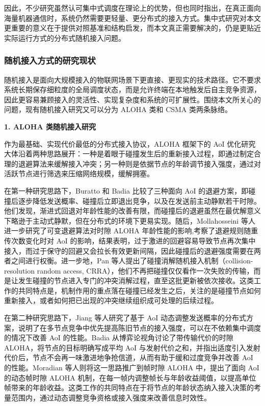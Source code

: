因此，不少研究虽然认可集中式调度在理论上的优势，但也同时指出，在真正面向海量机器通信时，系统仍然需要更轻量、更分布式的接入方式。集中式研究对本文更重要的意义在于提供对照基准和结构启发，而本文真正需要解决的，仍是更贴近实际运行方式的分布式随机接入问题。

\subsubsection{随机接入方式的研究现状}

随机接入是面向大规模接入的物联网场景下更直接、更现实的技术路径。它不要求系统长期保存细粒度的全局调度状态，而是允许终端在本地触发后自主竞争资源，因此更容易兼顾接入的灵活性、实现复杂度和系统的可扩展性\cite{chen2022age}。围绕本文所关心的问题，现有随机接入研究又可以分为 ALOHA 类和 CSMA 类两条脉络。

\textbf{1. ALOHA 类随机接入研究}

作为最基础、实现代价最低的分布式接入协议，ALOHA 框架下的 AoI 优化研究大体沿着两种思路展开：一种是着眼于碰撞发生后的重新接入过程，即通过制定合理的退避算法来缓解接入冲突；另一种则是依据节点的年龄调节接入强度，通过对活跃节点进行筛选来压缩网络规模，缓解拥塞。

在第一种研究思路下，Buratto 和 Badia 比较了三种面向 AoI 的退避方案，即碰撞后逐步降低发送概率、碰撞后立即退出竞争，以及在发送前主动静默若干时隙\cite{buratto2023analysis}。他们发现，渐进式回退对年龄性能的改善有限，而碰撞后的退避虽然在最优解意义下略逊于主动式静默，但在分布式的环境下更易实现。随后，Mollahosseini 等人进一步研究了可变退避算法对时隙 ALOHA 年龄性能的影响\cite{mollahosseini2024effect},考察了退避规则随重传次数变化时对 AoI 的影响，结果表明，过于激进的回避容易导致节点再次集中接入，而过于保守的回避又会拉长有效更新间隔，因此碰撞后的退避强度需要在两者之间进行权衡。进一步地，Pan 等人提出了碰撞消解随机接入机制（collision-resolution random access, CRRA）\cite{pan2022age}，他们不再把碰撞仅仅看作一次失败的传输，而是让发生碰撞的节点进入专门的冲突消解过程，直至这批更新被依次接收。这类工作的共同特点是，机制作用的重点落在碰撞已经发生之后，关注的是碰撞节点如何重新接入，或者如何把已出现的冲突继续组织成可处理的后续过程。

在第二种研究思路下，Jiang 等人研究了基于 AoI 动态调整发送概率的分布式方案，说明了在多节点竞争中优先提高陈旧节点的接入强度，可以在不依赖集中调度的情况下改善 AoI 的性能\cite{jiang2018can}。Badia 从博弈论视角讨论了带传输代价的时隙 ALOHA，将节点的目标明确写成平均 AoI 与发射代价之和，并指出适度引入发射代价后，节点不会再一味激进地争抢信道，从而有助于缓和过度竞争并改善 AoI 的性能\cite{badia2021impact}。Moradian 等人则将这一思路推广到帧时隙 ALOHA 中，提出了面向 AoI 的动态帧时隙 ALOHA 机制，在每一帧内调整帧长与年龄收益阈值，以提高单位帧带来的年龄收益\cite{moradian2024age}。这类工作的共同特点在于将节点的年龄状态纳入接入决策的考量范围内，通过动态调整竞争资格或接入强度来改善信息时效性。

